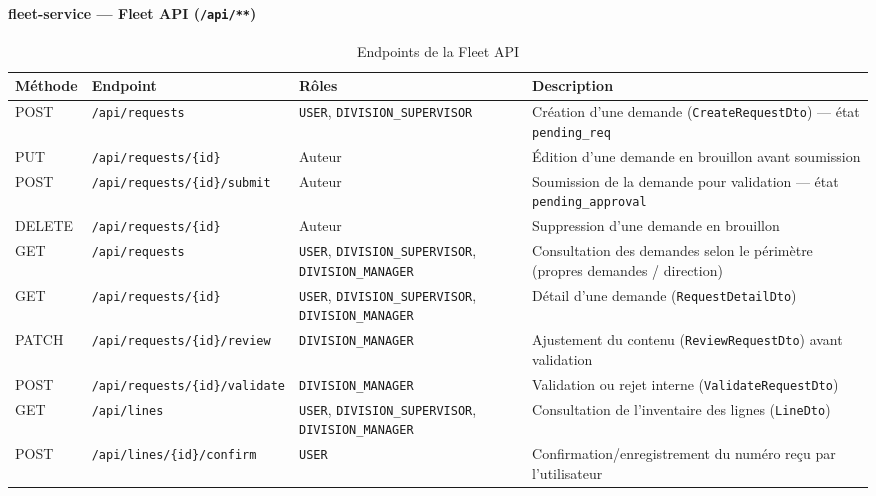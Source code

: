 \documentclass[11pt,a4paper]{article}
\begin{document}
\paragraph{fleet-service — Fleet API (\texttt{/api/**})}
\begin{table}[H]
\centering
\small
\begin{tabular}{|p{1.4cm}|p{3.6cm}|p{3cm}|p{5.2cm}|}
\hline
\textbf{Méthode} & \textbf{Endpoint} & \textbf{Rôles} & \textbf{Description} \\
\hline
POST & \texttt{/api/requests} & \texttt{USER}, \texttt{DIVISION\_SUPERVISOR} & Création d'une demande (\texttt{CreateRequestDto}) — état \texttt{pending\_req} \\
\hline
PUT & \texttt{/api/requests/\{id\}} & Auteur & Édition d'une demande en brouillon avant soumission \\
\hline
POST & \texttt{/api/requests/\{id\}/submit} & Auteur & Soumission de la demande pour validation — état \texttt{pending\_approval} \\
\hline
DELETE & \texttt{/api/requests/\{id\}} & Auteur & Suppression d'une demande en brouillon \\
\hline
GET & \texttt{/api/requests} & \texttt{USER}, \texttt{DIVISION\_SUPERVISOR}, \texttt{DIVISION\_MANAGER} & Consultation des demandes selon le périmètre (propres demandes / direction) \\
\hline
GET & \texttt{/api/requests/\{id\}} & \texttt{USER}, \texttt{DIVISION\_SUPERVISOR}, \texttt{DIVISION\_MANAGER} & Détail d'une demande (\texttt{RequestDetailDto}) \\
\hline
PATCH & \texttt{/api/requests/\{id\}/review} & \texttt{DIVISION\_MANAGER} & Ajustement du contenu (\texttt{ReviewRequestDto}) avant validation \\
\hline
POST & \texttt{/api/requests/\{id\}/validate} & \texttt{DIVISION\_MANAGER} & Validation ou rejet interne (\texttt{ValidateRequestDto}) \\
\hline
GET & \texttt{/api/lines} & \texttt{USER}, \texttt{DIVISION\_SUPERVISOR}, \texttt{DIVISION\_MANAGER} & Consultation de l'inventaire des lignes (\texttt{LineDto}) \\
\hline
POST & \texttt{/api/lines/\{id\}/confirm} & \texttt{USER} & Confirmation/enregistrement du numéro reçu par l'utilisateur \\
\hline
\end{tabular}
\caption{Endpoints de la Fleet API}
\end{table}
\end{document}
